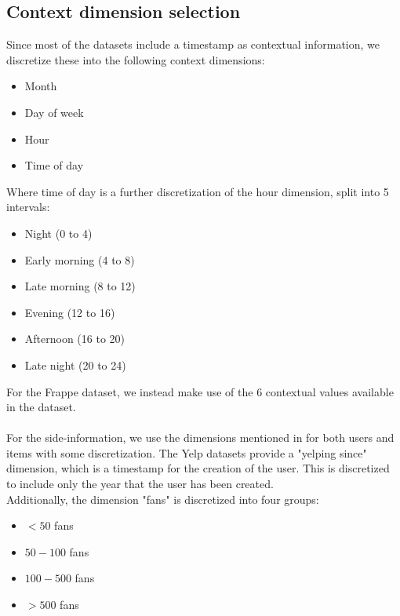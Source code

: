 \subsection{Context dimension selection}
Since most of the datasets include a timestamp as contextual information, we discretize these into the following context dimensions:
\begin{itemize}
    \item Month
    \item Day of week
    \item Hour
    \item Time of day
\end{itemize}
Where time of day is a further discretization of the hour dimension, split into 5 intervals:
\begin{itemize}
    \item Night (0 to 4)
    \item Early morning (4 to 8)
    \item Late morning (8 to 12)
    \item Evening (12 to 16)
    \item Afternoon (16 to 20)
    \item Late night (20 to 24)
\end{itemize}
For the Frappe dataset, we instead make use of the 6 contextual values available in the dataset.
\\\\
For the side-information, we use the dimensions mentioned in  for both users and items with some discretization.
The Yelp datasets provide a "yelping since" dimension, which is a timestamp for the creation of the user.
This is discretized to include only the year that the user has been created.
\\
Additionally, the dimension "fans" is discretized into four groups:
\begin{itemize}
    \item $< 50$ fans
    \item $50 - 100$ fans
    \item $100-500$ fans
    \item $> 500$ fans
\end{itemize}

